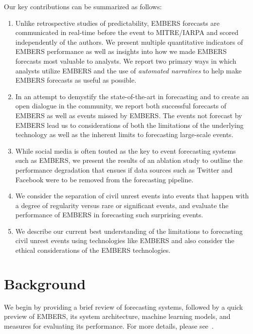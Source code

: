 \documentclass[11pt,a4paper,extrafontsizes,oneside]{article}
\begin{document}
Our key contributions can be summarized as follows:
\begin{enumerate}
\setlength\itemsep{0pt}
\itemsep0em
\item   Unlike retrospective studies of predictability, EMBERS forecasts are communicated in real-time before the
event to MITRE/IARPA and scored independently of the authors.
We present multiple quantitative indicators of EMBERS performance
as well as insights into how
we made EMBERS forecasts most valuable to analysts. We report two primary
ways in which analysts utilize EMBERS and the use of {\it automated
narratives} to help make EMBERS forecasts as useful as possible.

\item
In an attempt to demystify the state-of-the-art
in forecasting and to create an open dialogue in the community, we report both successful
forecasts of EMBERS as well as events missed by EMBERS. The events not forecast by EMBERS lead us to
considerations of both the limitations of the underlying technology as well as
the inherent limits to forecasting large-scale events.
\item
While social media is often touted as the key to event forecasting
systems such as EMBERS, we present the results of an ablation study to outline
the performance degradation that ensues if data sources
such as Twitter and Facebook were to be removed from the forecasting pipeline.
\item
We consider the separation of civil unrest events into events
that happen with a degree of regularity versus rare
or significant
events, and evaluate the performance of EMBERS in forecasting such
surprising events.
\item
We describe our current best understanding of the limitations to
forecasting civil unrest events using technologies like EMBERS and
also consider the ethical considerations of the EMBERS technologies.
\end{enumerate}


\section{Background}
\label{sec:background}
We begin by providing a brief review of forecasting systems, followed by a
quick preview of EMBERS, its system architecture, machine learning models,
and measures for evaluating its performance. For more details, please
see~\cite{kdd:beating-the-news}.
\end{document}
